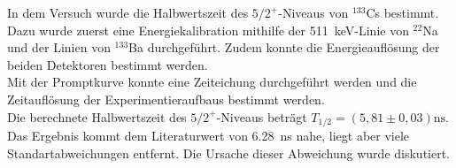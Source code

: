 In dem Versuch wurde die Halbwertszeit des $5/2^+$-Niveaus von $^{133}$Cs bestimmt. Dazu wurde zuerst eine Energiekalibration mithilfe der \SI{511}{keV}-Linie von $^{22}$Na und der Linien von $^{133}$Ba durchgeführt. Zudem konnte die Energieauflösung der beiden Detektoren bestimmt werden.\\

Mit der Promptkurve konnte eine Zeiteichung durchgeführt werden und die Zeitauflösung der Experimentieraufbaus bestimmt werden.\\

Die berechnete Halbwertszeit des $5/2^+$-Niveaus beträgt $T_{1/2} = (5,81 \pm 0,03) \si{\nano\second}$. Das Ergebnis kommt dem Literaturwert von \SI{6,28}{\nano\second} \cite{cs133} nahe, liegt aber viele Standartabweichungen entfernt. Die Ursache dieser Abweichung wurde diskutiert.  
